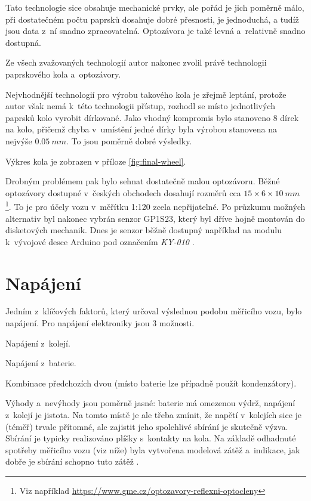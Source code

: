 Tato technologie sice obsahuje mechanické prvky, ale pořád je jich poměrně
málo, při dostatečném počtu paprsků dosahuje dobré přesnosti, je jednoduchá, a
tudíž jsou data z~ní snadno zpracovatelná. Optozávora je také levná a~relativně
snadno dostupná.

Ze všech zvažovaných technologií autor nakonec zvolil právě technologii
paprskového kola a~optozávory.

Nejvhodnější technologií pro výrobu takového kola je zřejmě leptání, protože
autor však nemá k~této technologii přístup, rozhodl se místo jednotlivých
paprsků kolo vyrobit dírkované. Jako vhodný kompromis bylo stanoveno
8 dírek na kolo, přičemž chyba v~umístění jedné dírky byla výrobou stanovena na
nejvýše $0.05\ mm$. To jsou poměrně dobré výsledky.

Výkres kola je zobrazen v příloze \ref{fig:final-wheel}.

Drobným problémem pak bylo sehnat dostatečně malou optozávoru. Běžné optozávory
dostupné v~českých obchodech dosahují rozměrů cca $15\times6\times10\ mm$
\footnote{Viz například
\url{https://www.gme.cz/optozavory-reflexni-optocleny}}. To je pro účely vozu
v~měřítku 1:120 zcela nepřijatelné. Po
průzkumu možných alternativ byl nakonec vybrán senzor
GP1S23\cite{gp1s23:datasheet}, který byl dříve hojně montován do disketových
mechanik. Dnes je senzor běžně dostupný například na modulu k~vývojové desce
Arduino pod označením \textit{KY-010} \cite{ky-010}.

\section{Napájení}
\label{sec:wsm-napajeni}

Jedním z~klíčových faktorů, který určoval výslednou podobu měřicího vozu, bylo
napájení. Pro napájení elektroniky jsou 3 možnosti.

\begin{compactenum}
\item Napájení z~kolejí.
\item Napájení z~baterie.
\item Kombinace předchozích dvou (místo baterie lze případně použít kondenzátory).
\end{compactenum}

Výhody a~nevýhody jsou poměrně jasné: baterie má omezenou výdrž, napájení
z~kolejí je jistota. Na tomto místě je ale třeba zmínit, že napětí v~kolejích
sice je (téměř) trvale přítomné, ale zajistit jeho spolehlivé sbírání je
skutečně výzva. Sbírání je typicky realizováno plíšky s~kontakty na kola.
Na základě odhadnuté spotřeby měřicího vozu (viz níže) byla vytvořena modelová
zátěž a~indikace, jak dobře je sbírání schopno tuto zátěž .

